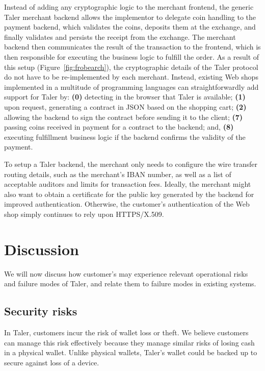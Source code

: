 \documentclass{llncs}
\begin{document}
Instead of adding any cryptographic logic to the merchant frontend,
the generic Taler merchant backend allows the implementor to delegate
coin handling to the payment backend, which validates the coins,
deposits them at the exchange, and finally validates and persists the
receipt from the exchange.  The merchant backend then communicates the
result of the transaction to the front\-end, which is then responsible
for executing the business logic to fulfill the order.  As a result of
this setup (Figure~\ref{fig:frobearch}), the cryptographic details
of the Taler protocol do not have to be re-implemented by each
merchant.  Instead, existing Web shops implemented in a multitude of
programming languages can straightforwardly add support for Taler by:
{\bf (0)} detecting in the browser that Taler is available; {\bf (1)}
upon request, generating a contract in JSON based on the shopping
cart; {\bf (2)} allowing the backend to sign the contract before
sending it to the client; {\bf (7)} passing coins received in payment
for a contract to the backend; and, {\bf (8)} executing fulfillment
business logic if the backend confirms the validity of the payment.

To setup a Taler backend, the merchant only needs to configure the
wire transfer routing details, such as the merchant's IBAN number, as
well as a list of acceptable auditors and limits for transaction fees.
Ideally, the merchant might also want to obtain a certificate for the
public key generated by the backend for improved authentication.
Otherwise, the customer's authentication of the Web shop simply
continues to rely upon HTTPS/X.509.


\section{Discussion}

We will now discuss how customer's may experience relevant operational
risks and failure modes of Taler, and relate them to failure modes
in existing systems.

\subsection{Security risks}

In Taler, customers incur the risk of wallet loss or theft.  We
believe customers can manage this risk effectively because they manage
similar risks of losing cash in a physical wallet.  Unlike physical
wallets, Taler's wallet could be backed up to secure against loss of a
device.
\end{document}
